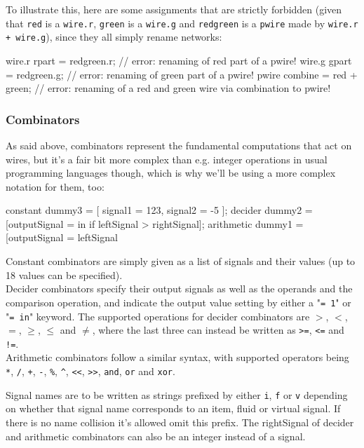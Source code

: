 \documentclass[landscape]{article}
\theoremstyle{plain}
\theoremstyle{definition}
\begin{document}
To illustrate this, here are some assignments that are strictly forbidden (given that \texttt{red} is a \texttt{wire.r}, \texttt{green} is a \texttt{wire.g} and \texttt{redgreen} is a \texttt{pwire} made by \texttt{wire.r + wire.g}), since they all simply rename networks:
\begin{langname}
wire.r rpart = redgreen.r;     // error: renaming of red part of a pwire!
wire.g gpart = redgreen.g;     // error: renaming of green part of a pwire!
pwire combine = red + green;   // error: renaming of a red and green wire via combination to pwire!
\end{langname}
\subsubsection{Combinators}
As said above, combinators represent the fundamental computations that act on wires, but it's a fair bit more complex than e.g. integer operations in usual programming languages though, which is why we'll be using a more complex notation for them, too:
\begin{langname}
constant dummy3 = [ signal1 = 123, signal2 = -5 ];
decider dummy2 = [outputSignal = in if leftSignal > rightSignal];
arithmetic dummy1 = [outputSignal = leftSignal %
\end{langname}
Constant combinators are simply given as a list of signals and their values (up to 18 values can be specified).\\
Decider combinators specify their output signals as well as the operands and the comparison operation, and indicate the output value setting by either a "\texttt{= 1}" or "\texttt{= in}" keyword. The supported operations for decider combinators are $>$, $<$, $=$, $\geq$, $\leq$ and $\neq$, where the last three can instead be written as \texttt{>=}, \texttt{<=} and \texttt{!=}.\\
Arithmetic combinators follow a similar syntax, with supported operators being \texttt{*}, \texttt{/}, \texttt{+}, \texttt{-}, \texttt{\%}, \texttt{\^}, \texttt{<<}, \texttt{>>}, \texttt{and}, \texttt{or} and \texttt{xor}.

Signal names are to be written as strings prefixed by either \texttt{i}, \texttt{f} or \texttt{v} depending on whether that signal name corresponds to an item, fluid or virtual signal. If there is no name collision it's allowed omit this prefix. The rightSignal of decider and arithmetic combinators can also be an integer instead of a signal.
\end{document}
